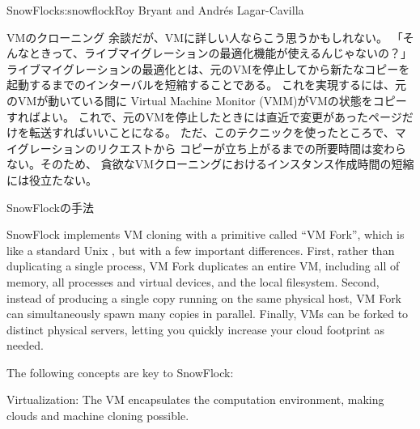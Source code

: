 \begin{aosachapter}{SnowFlock}{s:snowflock}{Roy Bryant and Andr\'e{s} Lagar-Cavilla}
\begin{aosasect1}{VMのクローニング}
余談だが、VMに詳しい人ならこう思うかもしれない。
「そんなときって、ライブマイグレーションの最適化機能が使えるんじゃないの？」
ライブマイグレーションの最適化とは、元のVMを停止してから新たなコピーを
起動するまでのインターバルを短縮することである。
これを実現するには、元のVMが動いている間に
Virtual Machine Monitor (VMM)がVMの状態をコピーすればよい。
これで、元のVMを停止したときには直近で変更があったページだけを転送すればいいことになる。
ただ、このテクニックを使ったところで、マイグレーションのリクエストから
コピーが立ち上がるまでの所要時間は変わらない。そのため、
貪欲なVMクローニングにおけるインスタンス作成時間の短縮には役立たない。

\end{aosasect1}

\begin{aosasect1}{SnowFlockの手法}

SnowFlock implements VM cloning with a primitive called ``VM Fork'',
which is like a standard Unix , but with a few
important differences.  First, rather than duplicating a single
process, VM Fork duplicates an entire VM, including all of memory, all
processes and virtual devices, and the local filesystem.  Second,
instead of producing a single copy running on the same physical host,
VM Fork can simultaneously spawn many copies in parallel. Finally, VMs
can be forked to distinct physical servers, letting you quickly
increase your cloud footprint as needed.

The following concepts are key to SnowFlock:

\begin{aosaitemize}

  \item Virtualization: The VM encapsulates the computation
  environment, making clouds and machine cloning possible.


\end{aosaitemize}
\end{aosasect1}
\end{aosachapter}
